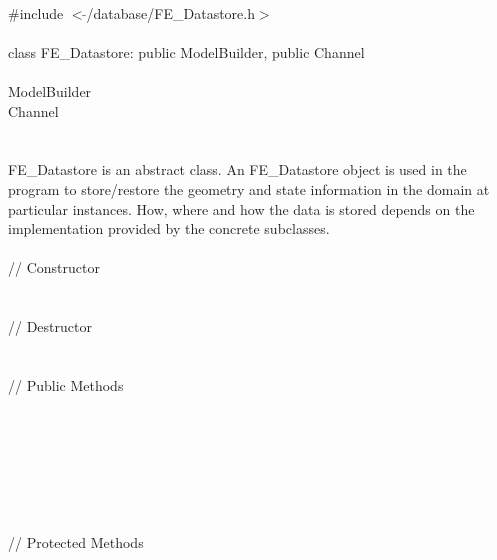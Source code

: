 
   \\
\indent \#include $<\tilde{ }$/database/FE\_Datastore.h$>$  \\

  \\
\indent class FE\_Datastore: public ModelBuilder, public Channel \\

 \\
\indent ModelBuilder \\
\indent Channel \\
\indent{} \\

  \\
\indent FE\_Datastore is an abstract class. An FE\_Datastore object is
used in the program to store/restore the geometry and state information 
in the domain at particular instances. How, where and how the data is
stored depends on the implementation provided by the concrete
subclasses. \\  

 \\
\indent // Constructor \\
\\ \\
\indent // Destructor \\
\\ \\
\indent // Public Methods  \\
\\
\\
\\\\
\\
\\ \\
\indent // Protected Methods  \\
\\

